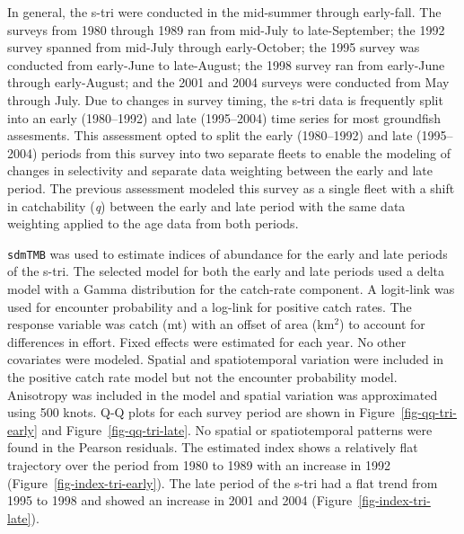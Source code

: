 \documentclass[
  english,
]{article}
\begin{document}
In general, the \gls{s-tri} were conducted in the mid-summer through
early-fall. The surveys from 1980 through 1989 ran from mid-July to
late-September; the 1992 survey spanned from mid-July through
early-October; the 1995 survey was conducted from early-June to
late-August; the 1998 survey ran from early-June through early-August;
and the 2001 and 2004 surveys were conducted from May through July. Due
to changes in survey timing, the \gls{s-tri} data is frequently split
into an early (1980--1992) and late (1995--2004) time series for most
groundfish assesments. This assessment opted to split the early
(1980--1992) and late (1995--2004) periods from this survey into two
separate fleets to enable the modeling of changes in selectivity and
separate data weighting between the early and late period. The previous
assessment modeled this survey as a single fleet with a shift in
catchability (\emph{q}) between the early and late period with the same
data weighting applied to the age data from both periods.

\texttt{sdmTMB} was used to estimate indices of abundance for the early
and late periods of the \gls{s-tri}. The selected model for both the
early and late periods used a delta model with a Gamma distribution for
the catch-rate component. A logit-link was used for encounter
probability and a log-link for positive catch rates. The response
variable was catch (mt) with an offset of area (km\(^2\)) to account for
differences in effort. Fixed effects were estimated for each year. No
other covariates were modeled. Spatial and spatiotemporal variation were
included in the positive catch rate model but not the encounter
probability model. Anisotropy was included in the model and spatial
variation was approximated using 500 knots. Q-Q plots for each survey
period are shown in Figure~\ref{fig-qq-tri-early} and
Figure~\ref{fig-qq-tri-late}. No spatial or spatiotemporal patterns were
found in the Pearson residuals. The estimated index shows a relatively
flat trajectory over the period from 1980 to 1989 with an increase in
1992 (Figure~\ref{fig-index-tri-early}). The late period of the
\gls{s-tri} had a flat trend from 1995 to 1998 and showed an increase in
2001 and 2004 (Figure~\ref{fig-index-tri-late}).
\end{document}
